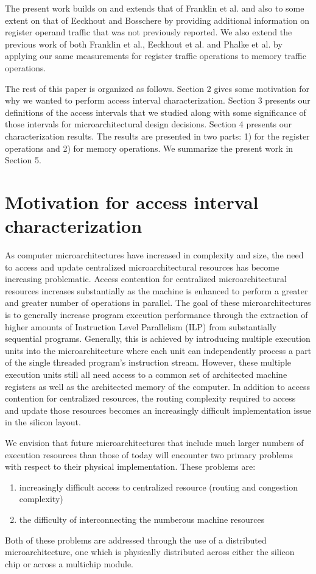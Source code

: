\documentclass[10pt,dvips]{article}
\begin{document}
The present work builds on and extends that of Franklin et al.
and also to some extent on that of Eeckhout and Bosschere
by providing
additional information on register operand traffic that was not
previously reported.
We also extend the previous work of both Franklin et al., Eeckhout et al.
and 
Phalke et al. by applying our same measurements for register traffic
operations to memory traffic operations.

The rest of this paper is organized as follows.
Section 2 gives some motivation for why we wanted to perform
access interval characterization.
Section 3 presents our definitions of the access intervals that
we studied along with some significance of those intervals
for microarchitectural design
decisions.
Section 4 presents our characterization results.
The results are presented in two parts:  
1) for the register
operations and 2) for memory operations.
We summarize the present work in Section 5.
%
%
\section{Motivation for access interval characterization}
%
As computer microarchitectures have increased in complexity and
size, the need to access and update centralized microarchitectural
resources has become increasing problematic.
Access contention for centralized microarchitectural resources
increases substantially as the machine is enhanced to perform
a greater and greater number of operations in parallel.
The goal of these microarchitectures is to generally increase
program execution performance through the extraction of higher
amounts of Instruction Level Parallelism (ILP) from substantially
sequential programs.
Generally, this is achieved by introducing multiple
execution units into the microarchitecture where each unit
can independently process a part of the single threaded program's
instruction stream.  
However, these multiple execution units
still all need access to a common set of architected machine registers
as well as the architected memory of the computer.
In addition to access contention for centralized resources,
the routing complexity required to access and update those
resources becomes an increasingly difficult implementation issue
in the silicon layout.

We envision that future microarchitectures that include
much larger numbers of execution resources than those of today
will encounter two primary problems with respect to their
physical implementation.
These problems are:
%
\begin{enumerate}
\item 
increasingly difficult
access to centralized resource (routing and congestion complexity)
\item 
the difficulty of interconnecting the numberous machine resources
\end{enumerate}
%
Both of these problems are addressed through the use of a
distributed microarchitecture, one which is physically distributed
across either the silicon chip or across a multichip module.
\end{document}
